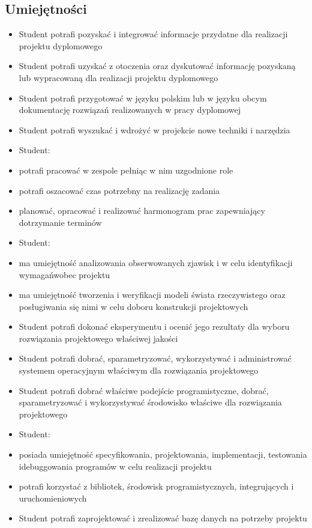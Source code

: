 \documentclass[12pt, a4paper]{article}
\begin{document}
\subsection*{Umiejętności}
\begin{itemize}
  \item Student potrafi pozyskać i integrować informacje przydatne dla realizacji projektu dyplomowego
  \item Student potrafi uzyskać z otoczenia oraz dyskutować informację pozyskaną lub wypracowaną dla realizacji projektu dyplomowego
  \item Student potrafi przygotować w języku polskim lub w języku obcym dokumentację rozwiązań realizowanych w pracy dyplomowej
  \item Student potrafi wyszukać i wdrożyć w projekcie nowe techniki i narzędzia
  \item Student:
  \item potrafi pracować w zespole pełniąc w nim uzgodnione role
  \item potrafi oszacować czas potrzebny na realizację zadania
  \item planować, opracować i realizować harmonogram prac zapewniający dotrzymanie terminów
  \item Student:
  \item ma umiejętność analizowania obserwowanych zjawisk i w celu identyfikacji wymagańwobec projektu
  \item ma umiejętność tworzenia i weryfikacji modeli świata rzeczywistego oraz posługiwania się nimi w celu doboru konstrukcji projektowych
  \item Student potrafi dokonać eksperymentu i ocenić jego rezultaty dla wyboru rozwiązania projektowego właściwej jakości
  \item Student potrafi dobrać, sparametryzować, wykorzystywać i administrować systemem operacyjnym właściwym dla rozwiązania projektowego
  \item Student potrafi dobrać właściwe podejście programistyczne, dobrać, sparametryzować i wykorzystywać środowisko właściwe dla rozwiązania projektowego
  \item Student:
  \item posiada umiejętność specyfikowania, projektowania, implementacji, testowania idebuggowania programów w celu realizacji projektu
  \item potrafi korzystać z bibliotek, środowisk programistycznych, integrujących i uruchomieniowych
  \item Student potrafi zaprojektować i zrealizować bazę danych na potrzeby projektu

\end{itemize}
\end{document}
